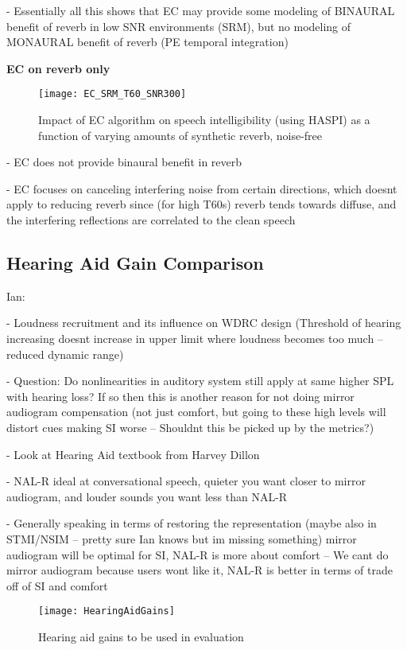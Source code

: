 - Essentially all this shows that EC may provide some modeling of BINAURAL benefit of reverb in low SNR environments (SRM), but no modeling of MONAURAL benefit of reverb (PE temporal integration)


\textbf{EC on reverb only}

\begin{figure}[H]
	\texttt{[image: EC\_SRM\_T60\_SNR300]}
	\centering
	\caption{Impact of EC algorithm on speech intelligibility (using HASPI) as a function of varying amounts of synthetic reverb, noise-free}
	\label{fig:EC_SRM_T60_SNR300}
\end{figure}

- EC does not provide binaural benefit in reverb

- EC focuses on canceling interfering noise from certain directions, which doesnt apply to reducing reverb since (for high T60s) reverb tends towards diffuse, and the interfering reflections are correlated to the clean speech



\subsection{Hearing Aid Gain Comparison}

Ian:

- Loudness recruitment and its influence on WDRC design (Threshold of hearing increasing doesnt increase in upper limit where loudness becomes too much -- reduced dynamic range)

- Question: Do nonlinearities in auditory system still apply at same higher SPL with hearing loss? If so then this is another reason for not doing mirror audiogram compensation (not just comfort, but going to these high levels will distort cues making SI worse -- Shouldnt this be picked up by the metrics?)

- Look at Hearing Aid textbook from Harvey Dillon

- NAL-R ideal at conversational speech, quieter you want closer to mirror audiogram, and louder sounds you want less than NAL-R

- Generally speaking in terms of restoring the representation (maybe also in STMI/NSIM -- pretty sure Ian knows but im missing something) mirror audiogram will be optimal for SI, NAL-R is more about comfort -- We cant do mirror audiogram because users wont like it, NAL-R is better in terms of trade off of SI and comfort

\begin{figure}[H]
	\texttt{[image: HearingAidGains]}
	\centering
	\caption{Hearing aid gains to be used in evaluation}
	\label{fig:HA_Gains}
\end{figure}

